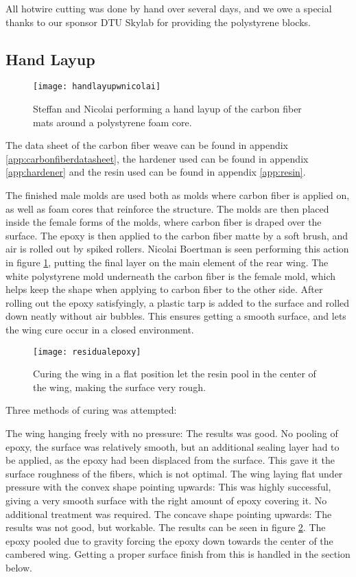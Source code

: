   All hotwire cutting was done by hand over several days, and we owe a special thanks to our sponsor DTU Skylab for providing the polystyrene blocks.

  \subsection{Hand Layup}

    \begin{figure}
      \texttt{[image: handlayupwnicolai]}
      \caption{Steffan and Nicolai performing a hand layup of the carbon fiber mats around a polystyrene foam core.}
      \label{fig:handlayup}
    \end{figure}

    The data sheet of the carbon fiber weave can be found in appendix \ref{app:carbonfiberdatasheet}, the hardener used can be found in appendix \ref{app:hardener} and the resin used can be found in appendix \ref{app:resin}.

    The finished male molds are used both as molds where carbon fiber is applied on, as well as foam cores that reinforce the structure. The molds are then placed inside the female forms of the molds, where carbon fiber is draped over the surface. The epoxy is then applied to the carbon fiber matte by a soft brush, and air is rolled out by spiked rollers. Nicolai Boertman is seen performing this action in figure \ref{fig:handlayup}, putting the final layer on the main element of the rear wing. The white polystyrene mold underneath the carbon fiber is the female mold, which helps keep the shape when applying to carbon fiber to the other side. After rolling out the epoxy satisfyingly, a plastic tarp is added to the surface and rolled down neatly without air bubbles. This ensures getting a smooth surface, and lets the wing cure occur in a closed environment.

    \begin{figure}
      \texttt{[image: residualepoxy]}
      \caption{Curing the wing in a flat position let the resin pool in the center of the wing, making the surface very rough.}
      \label{fig:roughsurface}
    \end{figure}

    Three methods of curing was attempted:

    The wing hanging freely with no pressure: The results was good. No pooling of epoxy, the surface was relatively smooth, but an additional sealing layer had to be applied, as the epoxy had been displaced from the surface. This gave it the surface roughness of the fibers, which is not optimal.
    The wing laying flat under pressure with the convex shape pointing upwards: This was highly successful, giving a very smooth surface with the right amount of epoxy covering it. No additional treatment was required.
    The concave shape pointing upwards: The results was not good, but workable. The results can be seen in figure \ref{fig:roughsurface}. The epoxy pooled due to gravity forcing the epoxy down towards the center of the cambered wing. Getting a proper surface finish from this is handled in the section below.



